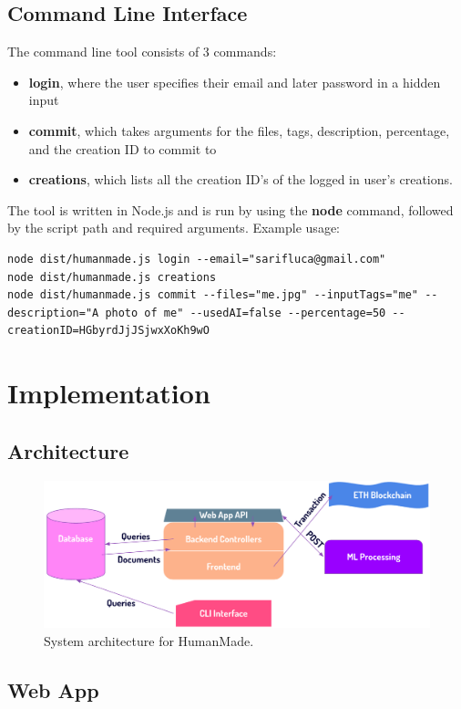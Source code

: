 \documentclass[12pt,a4paper]{article}
\begin{document}
\subsection{Command Line Interface}
The command line tool consists of 3 commands:
\begin{itemize}
    \item \textbf{login}, where the user specifies their email and later password in a hidden input
    \item \textbf{commit}, which takes arguments for the files, tags, description, percentage, and the creation ID to commit to
    \item \textbf{creations}, which lists all the creation ID's of the logged in user's creations.
\end{itemize}
The tool is written in Node.js and is run by using the \textbf{node} command, followed by the script path and required arguments. Example usage:
\begin{lstlisting}
node dist/humanmade.js login --email="sarifluca@gmail.com"
node dist/humanmade.js creations
node dist/humanmade.js commit --files="me.jpg" --inputTags="me" --description="A photo of me" --usedAI=false --percentage=50 --creationID=HGbyrdJjJSjwxXoKh9wO
\end{lstlisting}
\section{Implementation}
\subsection{Architecture}
\begin{figure}[H]
    \centering
    \includegraphics[scale=0.6]{architecture.png}
    \caption{System architecture for HumanMade. \cite{gpt4}}
\end{figure}
\subsection{Web App}
\end{document}
